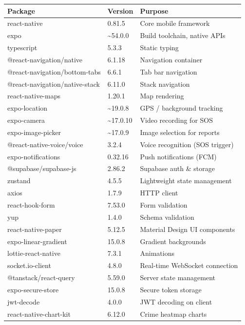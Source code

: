 \documentclass[12pt,a4paper]{report}
\begin{document}
\begin{longtable}{@{}p{5.5cm}p{3cm}p{5.5cm}@{}}
\toprule
\textbf{Package} & \textbf{Version} & \textbf{Purpose} \\
\midrule
\endhead
react-native & 0.81.5 & Core mobile framework \\
expo & \textasciitilde54.0.0 & Build toolchain, native APIs \\
typescript & 5.3.3 & Static typing \\
@react-navigation/native & 6.1.18 & Navigation container \\
@react-navigation/bottom-tabs & 6.6.1 & Tab bar navigation \\
@react-navigation/native-stack & 6.11.0 & Stack navigation \\
react-native-maps & 1.20.1 & Map rendering \\
expo-location & \textasciitilde19.0.8 & GPS / background tracking \\
expo-camera & \textasciitilde17.0.10 & Video recording for SOS \\
expo-image-picker & \textasciitilde17.0.9 & Image selection for reports \\
@react-native-voice/voice & 3.2.4 & Voice recognition (SOS trigger) \\
expo-notifications & 0.32.16 & Push notifications (FCM) \\
@supabase/supabase-js & 2.86.2 & Supabase auth \& storage \\
zustand & 4.5.5 & Lightweight state management \\
axios & 1.7.9 & HTTP client \\
react-hook-form & 7.53.0 & Form validation \\
yup & 1.4.0 & Schema validation \\
react-native-paper & 5.12.5 & Material Design UI components \\
expo-linear-gradient & 15.0.8 & Gradient backgrounds \\
lottie-react-native & 7.3.1 & Animations \\
socket.io-client & 4.8.0 & Real-time WebSocket connection \\
@tanstack/react-query & 5.59.0 & Server state management \\
expo-secure-store & 15.0.8 & Secure token storage \\
jwt-decode & 4.0.0 & JWT decoding on client \\
react-native-chart-kit & 6.12.0 & Crime heatmap charts \\
\bottomrule
\end{longtable}
\end{document}
